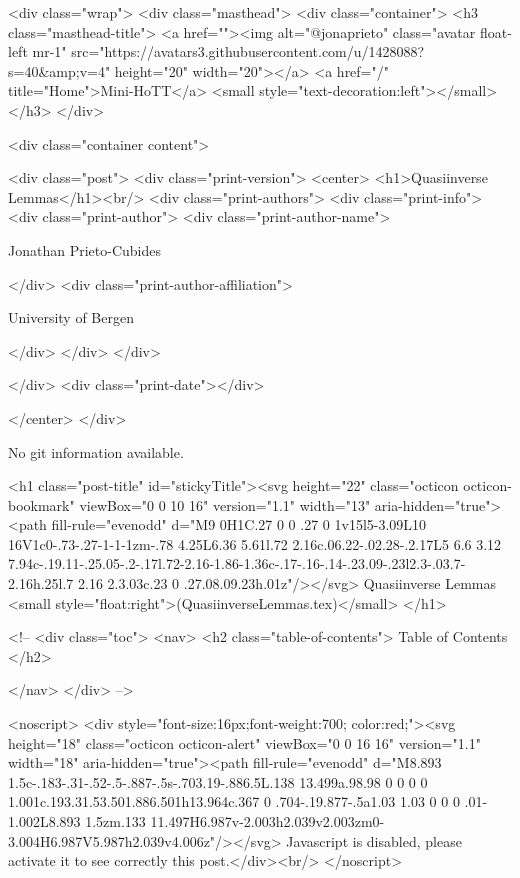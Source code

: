    <div class="wrap">
      <div class="masthead">
        <div class="container">
          <h3 class="masthead-title">
            <a href=""><img alt="@jonaprieto" class="avatar float-left mr-1" src="https://avatars3.githubusercontent.com/u/1428088?s=40&amp;v=4" height="20" width="20"></a>
            <a href="/" title="Home">Mini-HoTT</a>
            <small style="text-decoration:left"></small>
          </h3>
        </div>
      
      <div class="container content">
        







<div class="post">
  <div class="print-version">
    <center>
      <h1>Quasiinverse Lemmas</h1><br/>
        <div class="print-authors">
          <div class="print-info">
            <div class="print-author">
              <div class="print-author-name">
                
                  Jonathan Prieto-Cubides
                
              </div>
              <div class="print-author-affiliation">
                
                  University of Bergen
                
                </div>
            </div>
          </div>
          
          
        </div>
        <div class="print-date"></div>
        
        
    </center>
  </div>

  
  No git information available.
  

  <h1 class="post-title" id="stickyTitle"><svg height="22" class="octicon octicon-bookmark" viewBox="0 0 10 16" version="1.1" width="13" aria-hidden="true"><path fill-rule="evenodd" d="M9 0H1C.27 0 0 .27 0 1v15l5-3.09L10 16V1c0-.73-.27-1-1-1zm-.78 4.25L6.36 5.61l.72 2.16c.06.22-.02.28-.2.17L5 6.6 3.12 7.94c-.19.11-.25.05-.2-.17l.72-2.16-1.86-1.36c-.17-.16-.14-.23.09-.23l2.3-.03.7-2.16h.25l.7 2.16 2.3.03c.23 0 .27.08.09.23h.01z"/></svg> Quasiinverse Lemmas <small style="float:right">(QuasiinverseLemmas.tex)</small>
  </h1>

  <!-- 
  <div class="toc">
    <nav>
    <h2 class="table-of-contents"> Table of Contents </h2>
      

    </nav>
  </div>
   -->

  <noscript>
  <div style="font-size:16px;font-weight:700; color:red;"><svg height="18" class="octicon octicon-alert" viewBox="0 0 16 16" version="1.1" width="18" aria-hidden="true"><path fill-rule="evenodd" d="M8.893 1.5c-.183-.31-.52-.5-.887-.5s-.703.19-.886.5L.138 13.499a.98.98 0 0 0 0 1.001c.193.31.53.501.886.501h13.964c.367 0 .704-.19.877-.5a1.03 1.03 0 0 0 .01-1.002L8.893 1.5zm.133 11.497H6.987v-2.003h2.039v2.003zm0-3.004H6.987V5.987h2.039v4.006z"/></svg> Javascript is disabled, please activate it to see correctly this post.</div><br/>
  </noscript>

